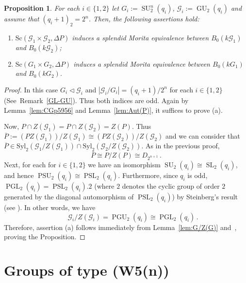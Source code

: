 \documentclass[12pt,a4paper]{amsart}
\theoremstyle{plain}\newtheorem{Theorem}{Theorem}[section]
\theoremstyle{plain}\newtheorem{Conjecture}[Theorem]{Conjecture}
\theoremstyle{plain}\newtheorem{Corollary}[Theorem]{Corollary}
\theoremstyle{plain}\newtheorem{Lemma}[Theorem]{Lemma}
\theoremstyle{plain}\newtheorem{Proposition}[Theorem]{Proposition}
\theoremstyle{definition}\newtheorem{Definition}[Theorem]{Definition}
\theoremstyle{definition}\newtheorem{Example}[Theorem]{Example}
\theoremstyle{definition}\newtheorem{Examples}[Theorem]{Examples}
\theoremstyle{definition}\newtheorem{Remark}[Theorem]{Remark}
\theoremstyle{definition}\newtheorem{Question}[Theorem]{Question}
\theoremstyle{definition}\newtheorem{Notation}[Theorem]{Notation}
\theoremstyle{definition}\newtheorem{Hypothesis}[Theorem]{Hypothesis}
\theoremstyle{definition}\newtheorem{Assumption}[Theorem]{Assumption}
\theoremstyle{definition}\newtheorem{Strategy}[Theorem]{Strategy}
\theoremstyle{definition}\newtheorem{Contents}[Theorem]{Contents}
\theoremstyle{definition}\newtheorem{Computations}[Theorem]{Computations}
\theoremstyle{definition}\newtheorem{Equivalences}[Theorem]{Equivalences}
\theoremstyle{definition}\newtheorem{Notation/Definition}[Theorem]{Notation/Definition}
\theoremstyle{definition}\newtheorem{noth}[Theorem]{}
\theoremstyle{plain}\newtheorem{Step}[Theorem]{Step}
\def\Syl{\mathrm{Syl}}
\newcommand{\PSL}{\operatorname{PSL}}
\newcommand{\SL}{\operatorname{SL}}
\newcommand{\PGL}{\operatorname{PGL}}
\newcommand{\PSU}{\operatorname{PSU}}
\newcommand{\SU}{\operatorname{SU}}
\newcommand{\PGU}{\operatorname{PGU}}
\newcommand{\GU}{\operatorname{GU}}
\begin{document}
\begin{Proposition}\label{pro:SU2^m}%
For each $i\in\{1,2\}$ let $G_i:=\SU^n_2(q_i)$, $\mathcal G_i:=\GU_2(q_i)$ and assume that $(q_i+1)_2=2^n$. Then, the following assertions hold:
\begin{enumerate}[label={\rm(\alph*)}, leftmargin=10mm] 
\item   
${\mathrm{Sc}}(\mathcal{G}_1\times\mathcal{G}_2, \Delta P)$ induces 
a splendid Morita equivalence between $B_0(k\mathcal G_1)$ and $B_0(k\mathcal G_2)$;
\item
 ${\mathrm{Sc}}(G_1\times G_2, \Delta P)$\! 
induces a splendid Morita equivalence between $B_0(kG_1)$\! and $B_0(kG_2)$.
\end{enumerate}
\end{Proposition} 
%
\begin{proof}
In this case $G_{i}\lhd\mathcal{G}_{i}$ and 
$|\mathcal G_i/G_i|=(q_i+1)/2^n$ for each $i\in\{1,2\}$ (See~Remark~\ref{GL-GU}). 
Thus both indices are odd. 
Again by Lemma~\ref{lem:CGp5956} and Lemma~\ref{lem:Aut(P)}, it suffices to prove (a).
\par
Now, $P\cap Z(\mathcal G_1)=P\cap Z(\mathcal G_2)=Z(P)$. Thus 
$\overline P:=(PZ(\mathcal G_1))/Z(\mathcal G_1)
\cong (PZ(\mathcal G_2))/Z(\mathcal G_2)$
and we can consider that 
$\overline P\in\Syl_2(\mathcal G_1/Z(\mathcal G_1))\cap\Syl_2(\mathcal G_2/Z(\mathcal G_2))$.
As in the previous proof, 
$$\overline P\cong P/Z(P)\cong D_{2^{n+1}}\,.$$  
Next,  for each for $i\in\{1,2\}$ we have an isomorphism $\SU_2(q_i)\cong\SL_2(q_i)$,  
and hence $\PSU_2(q_i)\cong\PSL_2(q_i)$. Furthermore, since $q_i$ is odd, 
$\PGL_2(q_i)=\PSL_2(q_i).2$ (where $2$ denotes the cyclic group of order $2$ generated by
the diagonal automorphism of $\PSL_2(q_i)$) by Steinberg's result
(see \cite[Chap.6 (8.8), p.\,511 and Theorem 8.11]{Suz86}). 
In other words, we have
\begin{equation}\label{PGL-PGU} \qquad
\mathcal G_i/Z(\mathcal G_i)=\PGU_2(q_i)\cong\PGL_2(q_i)\,.
\end{equation}
Therefore, assertion (a) follows immediately from Lemma~\ref{lem:G/Z(G)}
and~\cite[Theorem~1.1]{KL20a}, proving the Proposition.
\end{proof}





\section{Groups of type {\sf (W5(n))}}
\label{sec:W5}
\end{document}
